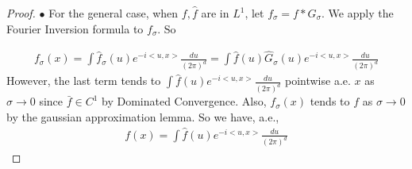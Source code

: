 \documentclass[a4paper]{article}
\begin{document}
\begin{proof}
$\bullet$ For the general case, when $f,\hat{f}$ are in $L^1$, let $f_\sigma = f*G_\sigma$. We apply the Fourier Inversion formula to $f_\sigma$. So

\begin{equation*}
\begin{aligned}
f_\sigma(x) = \int \hat{f}_\sigma(u) e^{-i<u,x>} \frac{du}{(2\pi)^d} = \int \hat{f} (u) \hat{G}_\sigma(u) e^{-i<u,x>} \frac{du}{(2\pi)^d}
\end{aligned}
\end{equation*}
However, the last term tends to $\int \hat{f}(u) e^{-i<u,x>} \frac{du}{(2\pi)^d}$ pointwise a.e. $x$ as $\sigma \to 0$ since $\bar{f} \in C^1$ by Dominated Convergence. Also, $f_\sigma(x)$ tends to $f$ as $\sigma \to 0$ by the gaussian approximation lemma. So we have, a.e., 
\begin{equation*}
\begin{aligned}
f(x) = \int \hat{f} (u) e^{-i<u,x>} \frac{du}{(2\pi)^d}
\end{aligned}
\end{equation*}
\end{proof}
\end{document}
